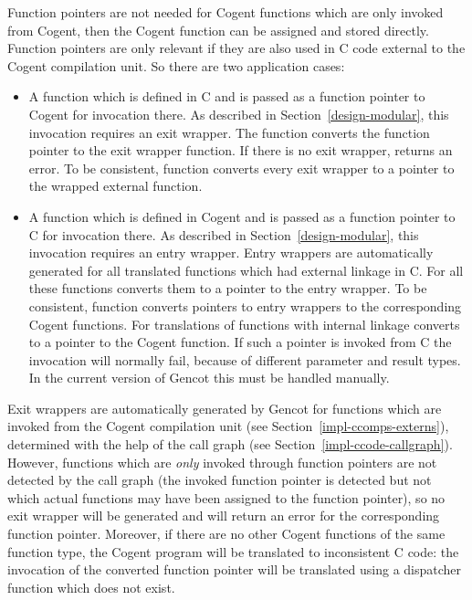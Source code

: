 Function pointers are not needed for Cogent functions which are only invoked from Cogent, then the Cogent function can 
be assigned and stored directly. Function pointers are only relevant if they are also used in C code external to
the Cogent compilation unit. So there are two application cases:
\begin{itemize}
\item A function which is defined in C and is passed as a function pointer to Cogent for invocation there. As
described in Section~\ref{design-modular}, this invocation requires an exit wrapper. The function 
converts the function pointer to the exit wrapper function. If there is no exit wrapper, 
returns an error. To be consistent, function  converts every exit wrapper to a pointer to the
wrapped external function.
\item A function which is defined in Cogent and is passed as a function pointer to C for invocation there. As
described in Section~\ref{design-modular}, this invocation requires an entry wrapper. Entry wrappers are automatically
generated for all translated functions which had external linkage in C. For all these functions 
converts them to a pointer to the entry wrapper. To be consistent, function  converts pointers
to entry wrappers to the corresponding Cogent functions. For translations of functions with internal linkage
 converts to a pointer to the Cogent function. If such a pointer is invoked from C the invocation
will normally fail, because of different parameter and result types. In the current version of Gencot this must
be handled manually.
\end{itemize}

Exit wrappers are automatically generated by Gencot for functions which are invoked from the Cogent compilation
unit (see Section~\ref{impl-ccomps-externs}), determined with the help of the call graph (see 
Section~\ref{impl-ccode-callgraph}). However, functions which are \textit{only} invoked through function pointers
are not detected by the call graph (the invoked function pointer is detected but not which actual functions
may have been assigned to the function pointer), so no exit wrapper will be generated and 
will return an error for the corresponding function pointer. Moreover, if there are no other Cogent functions
of the same function type, the Cogent program will be translated to inconsistent C code: the invocation of the 
converted function pointer will be translated using a dispatcher function which does not exist.

